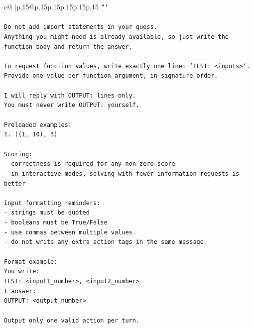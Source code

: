\documentclass{article}
\begin{document}
{\begin{supertabular}{c@{$\;$}|p{.15\linewidth}@{}p{.15\linewidth}p{.15\linewidth}p{.15\linewidth}p{.15\linewidth}p{.15\linewidth}}
{{{\texttt{```} \\
\\ 
\texttt{Do not add import statements in your guess.} \\
\texttt{Anything you might need is already available, so just write the function body and return the answer.} \\
\\ 
\texttt{To request function values, write exactly one line: `TEST: <inputs>`.} \\
\texttt{Provide one value per function argument, in signature order.} \\
\\ 
\texttt{I will reply with OUTPUT: lines only.} \\
\texttt{You must never write OUTPUT: yourself.} \\
\\ 
\texttt{Preloaded examples:} \\
\texttt{1. ((1, 10), 3)} \\
\\ 
\texttt{Scoring:} \\
\texttt{{-} correctness is required for any non{-}zero score} \\
\texttt{{-} in interactive modes, solving with fewer information requests is better} \\
\\ 
\texttt{Input formatting reminders:} \\
\texttt{{-} strings must be quoted} \\
\texttt{{-} booleans must be True/False} \\
\texttt{{-} use commas between multiple values} \\
\texttt{{-} do not write any extra action tags in the same message} \\
\\ 
\texttt{Format example:} \\
\texttt{You write:} \\
\texttt{TEST: <input1\_number>, <input2\_number>} \\
\texttt{I answer:} \\
\texttt{OUTPUT: <output\_number>} \\
\\ 
\texttt{Output only one valid action per turn.} \\
            }
        }
    }
     \\ \\


\end{supertabular}}
\end{document}
